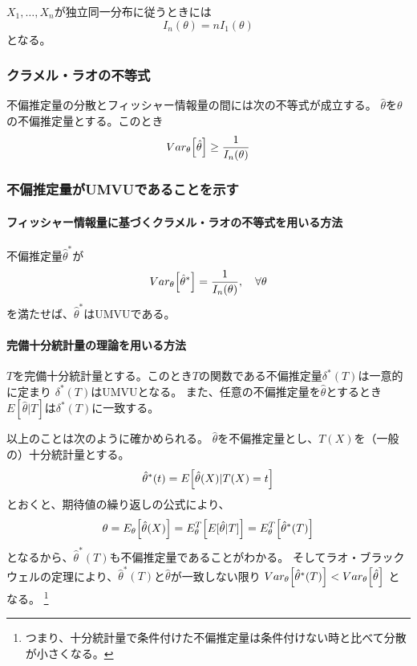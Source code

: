 \(X_1, \dots, X_n\)が独立同一分布に従うときには
\begin{equation}
  I_n(\theta) = nI_1(\theta)
\end{equation}
となる。

\subsubsection{クラメル・ラオの不等式}

不偏推定量の分散とフィッシャー情報量の間には次の不等式が成立する。
\(\hat{\theta}\)を\(\theta\)の不偏推定量とする。このとき
\begin{equation}
  Var_{\theta} \qty [\hat{\theta}] \geq \frac{1}{I_n(\theta)}
\end{equation}

\subsubsection{不偏推定量がUMVUであることを示す}

\paragraph{フィッシャー情報量に基づくクラメル・ラオの不等式を用いる方法}

不偏推定量\(\hat{\theta}^{*}\)が
\begin{equation}
  Var_{\theta} \qty [\hat{\theta}^{*}] = \frac{1}{I_n(\theta)}, \quad \forall \theta
\end{equation}
を満たせば、\(\hat{\theta}^{*}\)はUMVUである。


\paragraph{完備十分統計量の理論を用いる方法}

\(T\)を完備十分統計量とする。このとき\(T\)の関数である不偏推定量\(\delta^{*}(T)\)は一意的に定まり
\(\delta^{*}(T)\)はUMVUとなる。
また、任意の不偏推定量を\(\hat{\theta}\)とするとき
\(E[\hat{\theta} | T]\)は\(\delta^{*}(T)\)に一致する。

以上のことは次のように確かめられる。
\(\hat{\theta}\)を不偏推定量とし、\(T(X)\)を（一般の）十分統計量とする。
\begin{equation}
  \hat{\theta}^{*}(t) = E \qty [\hat{\theta}(X) | T(X) = t]
\end{equation}
とおくと、期待値の繰り返しの公式により、
\begin{equation}
  \theta = E_{\theta} \qty [\hat{\theta}(X)] = E_{\theta}^{T} \qty [E [\hat{\theta}|T]] = E_{\theta}^{T} \qty [\hat{\theta}^{*}(T)]
\end{equation}
となるから、\(\hat{\theta}^{*}(T)\)も不偏推定量であることがわかる。
そしてラオ・ブラックウェルの定理により、\(\hat{\theta}^{*}(T)\)と\(\hat{\theta}\)が一致しない限り
\(Var_{\theta} \qty [\hat{\theta}^{*}(T)] < Var_{\theta} \qty [\hat{\theta}]\) となる。
\footnote{つまり、十分統計量で条件付けた不偏推定量は条件付けない時と比べて分散が小さくなる。}


